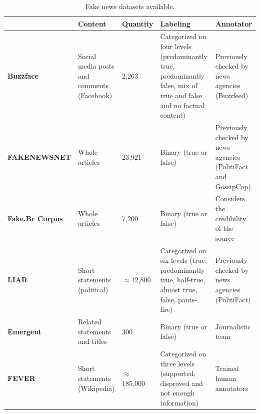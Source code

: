 \documentclass{ieeeaccess}
\begin{document}
\begin{table} [tb!]
\footnotesize
\centering
\caption{Fake news datasets available.}
\label{tab:datasets}
\begin{tabular}{|M{.16\textwidth}|M{.12\textwidth}|M{.1\textwidth}|M{.3\textwidth}|M{.2\textwidth}|} 
  & \textbf{Content}             & \textbf{Quantity} & \textbf{Labeling}                                                                                                 & \textbf{Annotator}                               \\ 
\hline 
\textbf{Buzzface} \cite{santia2018buzzface}              & Social media posts and comments (Facebook) & 2,263            & Categorized on four levels (predominantly true, predominantly false, mix of true and false and no factual content)& Previously checked by news agencies (Buzzfeed)                \\ 
\hline
\textbf{FAKENEWSNET} \cite{shu2020fakenewsnet}           & Whole articles                                    & 23,921           & Binary (true or false)                                                                                                           & Previously checked by news agencies (PolitiFact and GossipCop)  \\ 
\hline
\textbf{Fake.Br Corpus} \cite{monteiro2018contributions} & Whole articles                                    & 7,200            & Binary (true or false)                                                                                                           & Considers the credibility of the source                                     \\ 
\hline
\textbf{LIAR} \cite{wang2017liar}                        & Short statements (political)                      & $\approx$12,800           & Categorized on six levels (true, predominantly true, half-true, almost true, false, pants-fire)                          & Previously checked by news agencies (PolitiFact)              \\ 
\hline
\textbf{Emergent} \cite{ferreira2016emergent}            & 
Related statements and titles                  & 300             & Binary (true or false)                                                                                                           & Journalistic team                                                    \\ 
\hline
\textbf{FEVER} \cite{thorne-etal-2018-fever}             & Short statements (Wikipedia)                      & $\approx$185,000            & Categorized on three levels (supported, disproved and not enough information)                                                               & Trained human annotators                                           \\ 

\end{tabular}
\end{table}
\end{document}
